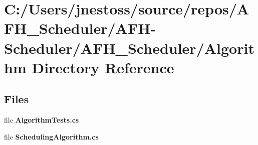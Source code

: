 \section{C\+:/\+Users/jnestoss/source/repos/\+A\+F\+H\+\_\+\+Scheduler/\+A\+F\+H-\/\+Scheduler/\+A\+F\+H\+\_\+\+Scheduler/\+Algorithm Directory Reference}
\label{dir_3960546fcd73274ff080caf875dd54e9}
\subsection*{Files}
\begin{DoxyCompactItemize}
\item 
file \textbf{ Algorithm\+Tests.\+cs}
\item 
file \textbf{ Scheduling\+Algorithm.\+cs}
\end{DoxyCompactItemize}
